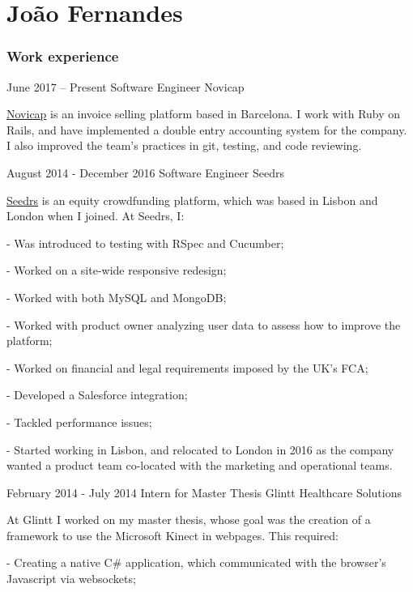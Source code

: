 \documentclass{tccv}
\begin{document}
\part{João Fernandes}

\section{Work experience}

\begin{eventlist}

\item{June 2017 -- Present}
     {Software Engineer}
     {Novicap}

\href{https://novicap.com/}{Novicap} is an invoice selling platform based in Barcelona. I work with Ruby on Rails,
and have implemented a double entry accounting system for the company. I also
improved the team's practices in git, testing, and code reviewing.

\item{August 2014 - December 2016}
     {Software Engineer}
     {Seedrs}

\href{https://www.seedrs.com/}{Seedrs} is an equity crowdfunding platform, which was based in Lisbon and London when I joined.
At Seedrs, I:

- Was introduced to testing with RSpec and Cucumber;

- Worked on a site-wide responsive redesign;

- Worked with both MySQL and MongoDB;

- Worked with product owner analyzing user data to assess how to improve the platform;

- Worked on financial and legal requirements imposed by the UK's FCA;

- Developed a Salesforce integration;

- Tackled performance issues;

- Started working in Lisbon, and relocated to London in 2016 as the company wanted a product
team co-located with the marketing and operational teams.

\item{February 2014 - July 2014}
     {Intern for Master Thesis}
     {Glintt Healthcare Solutions}

At Glintt I worked on my master thesis, whose goal was the creation of a framework
to use the Microsoft Kinect in webpages. This required:

- Creating a native C\# application, which communicated with the browser's Javascript via websockets;


\end{eventlist}
\end{document}
